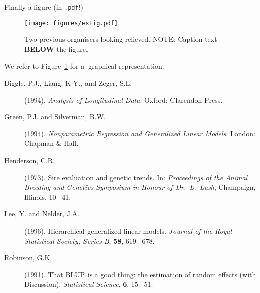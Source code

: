 \documentclass[twoside]{report}
\begin{document}

%
%

Finally a figure (in \verb|.pdf|!)

\begin{figure}[!ht]\centering
\texttt{[image: figures/exFig.pdf]}
\caption{\label{smith:fig1} Two previous organisers looking relieved.  NOTE: Caption text \textbf{BELOW} the figure.}
\end{figure}


We refer to Figure~\ref{smith:fig1} for a~graphical representation.






\begin{description}
\item[Diggle, P.J., Liang, K-Y., and Zeger, S.L.] (1994).
     {\it Analysis of Longitudinal Data}.
     Oxford: Clarendon Press.
\item[Green, P.J. and Silverman, B.W.] (1994).
     {\it Nonparametric Regression and Generalized Linear Models}.
     London: Chapman \& Hall.
\item[Henderson, C.R.] (1973).
     Sire evaluation and genetic trends.
     In: {\it Proceedings of the Animal Breeding and Genetics Symposium in
     Honour of Dr.\ L.\ Lush}, Champaign, Illinois, 10\,--\,41.
\item[Lee, Y. and Nelder, J.A.] (1996).
     Hierarchical generalized linear models.
     {\it Journal of the Royal Statistical Society, Series B}, {\bf 58},
      619\,--\,678.
\item[Robinson, G.K.] (1991).
     That BLUP is a good thing: the estimation of random effects (with Discussion).
     {\it Statistical Science}, {\bf 6}, 15\,--\,51.
\end{description}
\end{document}
